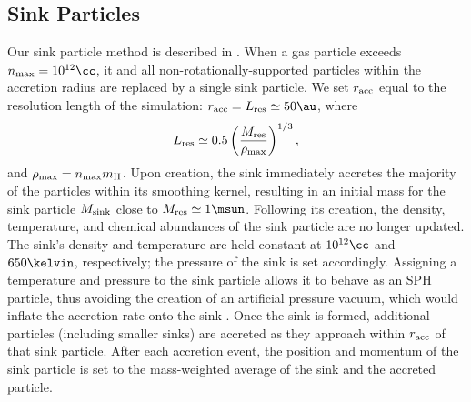 \subsection{Sink Particles}
\label{sinkParticles}
Our sink particle method is described in \citet{StacyGreifBromm2010}. When a gas particle exceeds $n_{\rm max} = 10^{12}\cc$, it and all non-rotationally-supported particles within the accretion radius are replaced by a single sink particle.  We set $r_{\rm acc}$ equal to the resolution length of the simulation: $r_{\rm acc} = L_{\rm res} \simeq 50\au$, where 
\begin{equation}
L_{\rm res} \simeq 0.5 \left( \frac{M_{\rm res}}{\rho_{\rm max}} \right)^{1/3},
\end{equation}
and $\rho_{\rm max} = n_{\rm max} m_{\rm H}$.  Upon creation, the sink immediately accretes the majority of the particles within its smoothing kernel, resulting in an initial mass for the sink particle $M_{\rm sink}$ close to $M_{\rm res} \simeq 1\msun$.  Following its creation, the density, temperature, and chemical abundances of the sink particle are no longer updated.  The sink's density and temperature are held constant at $10^{12}\cc$ and $650\kelvin$, respectively; the pressure of the sink is set accordingly. Assigning a temperature and pressure to the sink particle allows it to behave as an SPH particle, thus avoiding the creation of an artificial pressure vacuum, which would inflate the accretion rate onto the sink \citep[see][]{BrommCoppiLarson2002, MartelEvansShapiro2006}. Once the sink is formed, additional particles (including smaller sinks) are accreted as they approach within $r_{\rm acc}$ of that sink particle.  After each accretion event, the position and momentum of the sink particle is set to the mass-weighted average of the sink and the accreted particle.